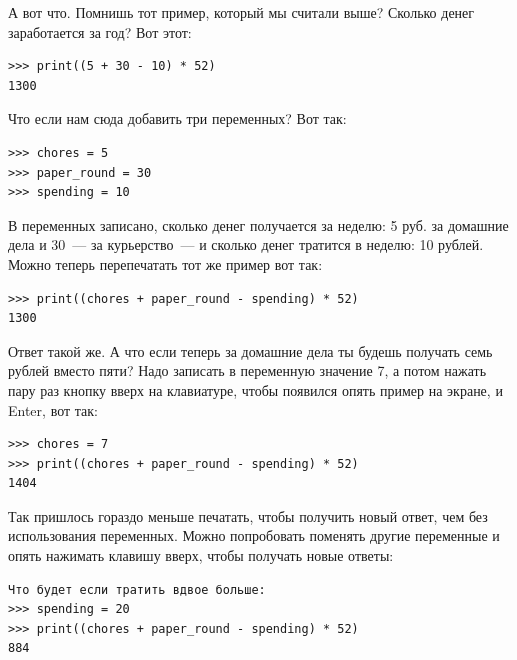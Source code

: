 А вот что. Помнишь тот пример, который мы считали выше? Сколько денег заработается за год? Вот этот:

\begin{listing}
\begin{verbatim}
>>> print((5 + 30 - 10) * 52)
1300
\end{verbatim}
\end{listing}

Что если нам сюда добавить три переменных? Вот так:

\begin{listing}
\begin{verbatim}
>>> chores = 5
>>> paper_round = 30
>>> spending = 10
\end{verbatim}
\end{listing}

В переменных записано, сколько денег получается за неделю: 5 руб. за домашние дела и 30 — за курьерство — и сколько денег тратится в неделю: 10 рублей. Можно теперь перепечатать тот же пример вот так:

\begin{listing}
\begin{verbatim}
>>> print((chores + paper_round - spending) * 52)
1300
\end{verbatim}
\end{listing}

Ответ такой же. А что если теперь за домашние дела ты будешь получать семь рублей вместо пяти? Надо записать в переменную  значение 7, а потом нажать пару раз кнопку вверх на клавиатуре, чтобы появился опять пример на экране, и Enter, вот так:

\begin{listing}
\begin{verbatim}
>>> chores = 7
>>> print((chores + paper_round - spending) * 52)
1404
\end{verbatim}
\end{listing}

Так пришлось гораздо меньше печатать, чтобы получить новый ответ, чем без использования переменных. Можно попробовать поменять другие переменные и опять нажимать клавишу вверх, чтобы получать новые ответы:

\begin{listing}
\begin{verbatim}
Что будет если тратить вдвое больше:
>>> spending = 20
>>> print((chores + paper_round - spending) * 52)
884
\end{verbatim}
\end{listing}

